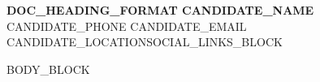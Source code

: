 \documentclass[letterpaper,{{DOC_FONT_SIZE}}]{extarticle}
\begin{document}
\begin{center}
    \textbf{\Huge {{DOC_HEADING_FORMAT}} {{CANDIDATE_NAME}}} \\ \vspace{5pt}
    \small {{CANDIDATE_PHONE}} {{CANDIDATE_EMAIL}}
    {{CANDIDATE_LOCATION}}{{SOCIAL_LINKS_BLOCK}}
\end{center}

{{BODY_BLOCK}}
\end{document}
